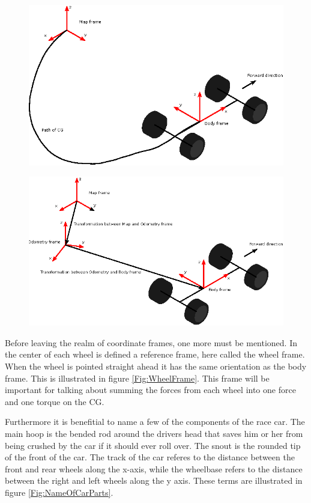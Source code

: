 \begin{figure}
    \centering
    \includegraphics[width=0.5\linewidth]{0_Images/2_Introduction/MapAndBodyFrames.eps}
    \label{Fig:MapAndBodyFrames}
\end{figure}

\begin{figure}
    \centering
    \includegraphics[width=0.5\linewidth]{0_Images/2_Introduction/MapOdomAndBodyFrames.eps}
    \label{Fig:MapOdomAndBodyFrames}
\end{figure}

Before leaving the realm of coordinate frames, one more must be mentioned. In the center of each wheel is defined a reference frame, here called the wheel frame. When the wheel is pointed straight ahead it has the same orientation as the body frame. This is illustrated in figure \ref{Fig:WheelFrame}. This frame will be important for talking about summing the forces from each wheel into one force and one torque on the CG. 

Furthermore it is benefitial to name a few of the components of the race car. The main hoop is the bended rod around the drivers head that saves him or her from being crushed by the car if it should ever roll over. The snout is the rounded tip of the front of the car. The track of the car referes to the distance between the front and rear wheels along the x-axis, while the wheelbase refers to the distance between the right and left wheels along the y axis. These terms are illustrated in figure \ref{Fig:NameOfCarParts}.

